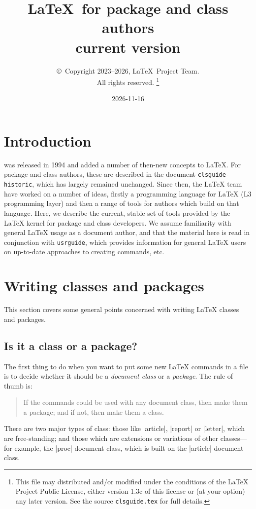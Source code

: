 \documentclass{ltxguide}
\title{\LaTeX\ for package and class authors\\current version}
\author{\copyright~Copyright 2023--2026, \LaTeX\ Project Team.\\
   All rights reserved.%
   \footnote{This file may distributed and/or modified under the
     conditions of the \LaTeX{} Project Public License, either version 1.3c
     of this license or (at your option) any later version. See the source
    \texttt{clsguide.tex} for full details.}%
}
\date{2026-11-16}
\begin{document}
\maketitle

\tableofcontents

\section{Introduction}

\LaTeXe{} was released in 1994 and added a number of then-new concepts to
\LaTeX{}. For package and class authors, these are described in the document
\texttt{clsguide-historic}, which has largely remained unchanged. Since then,
the \LaTeX{} team have worked on a number of ideas, firstly a programming
language for \LaTeX{} (L3 programming layer) and then a range of tools for
authors which build on that language. Here, we describe the current, stable set
of tools provided by the \LaTeX{} kernel for package and class developers. We
assume familiarity with general \LaTeX{} usage as a document author, and that
the material here is read in conjunction with \texttt{usrguide}, which provides
information for general \LaTeX{} users on up-to-date approaches to creating
commands, etc.

\section{Writing classes and packages}
\label{sec:writing}

This section covers some general points concerned with writing
\LaTeX{} classes and packages.

\subsection{Is it a class or a package?}
\label{sec:classorpkg}

The first thing to do when you want to put some new \LaTeX{} commands
in a file is to decide whether it should be a \emph{document class} or a
\emph{package}.  The rule of thumb is:
\begin{quote}
  If the commands could be used with any document class, then make
  them a package; and if not, then make them a class.
\end{quote}

There are two major types of class: those like |article|, |report| or
|letter|, which are free-standing; and those which are extensions or
variations of other classes---for example, the |proc| document class,
which is built on the |article| document class.
\end{document}
